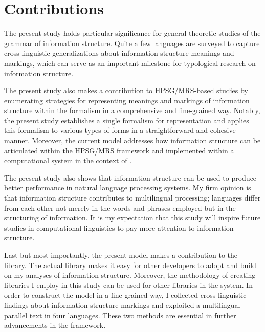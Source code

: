 \section{Contributions}
\label{15:sec:contributions}

The present study holds particular significance for general theoretic
studies of the grammar of information structure. Quite a few languages
are surveyed to capture cross-linguistic generalizations about
information structure meanings and markings, which can serve as an
important milestone for typological research on information structure.


The present study also makes a contribution to HPSG/MRS-based
studies by enumerating strategies for representing
meanings and markings of information structure within the formalism in
a comprehensive and fine-grained way.  Notably, the present study
establishes a single formalism for representation and applies this
formalism to various types of forms in a straightforward and cohesive
manner. Moreover, the current model addresses how information
structure can be articulated within the HPSG/MRS framework and
implemented within a computational system in the context of
.



The present study also shows that information structure can be used to
produce better performance in natural language processing systems. My
firm opinion is that information structure contributes to multilingual
processing; languages differ from each other not merely in the words
and phrases employed but in the structuring of information. It is my
expectation that this study will inspire future studies in
computational linguistics to pay more attention to information
structure.


Last but most importantly, the present model makes a contribution to
the \lingo {} library. The actual library makes it
easy for other developers to adopt and build on my analyses of
information structure.  Moreover, the methodology of creating
libraries I employ in this study can be used for other libraries in
the system.  In order to construct the model in a fine-grained way, I
collected cross-linguistic findings about information structure
markings and exploited a multilingual parallel text in four
languages. These two methods are essential in further advancements in
the \lingo framework.





